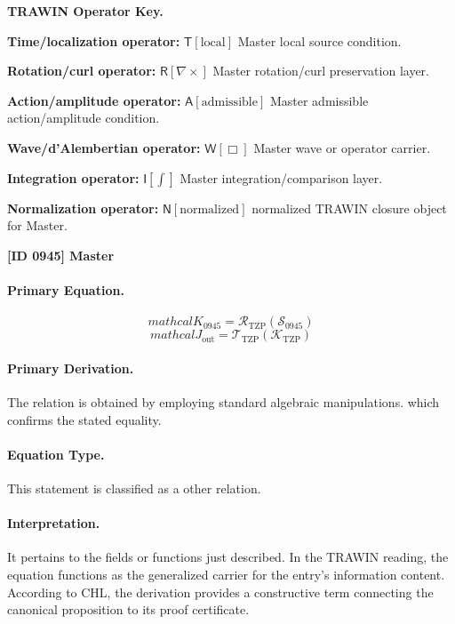 \par\vspace{0.45\baselineskip}
\noindent\begin{minipage}[t]{\linewidth}
\begingroup
\small
\raggedright
\textbf{TRAWIN Operator Key.}\par
\noindent\textbf{Time/localization operator:} $\mathsf{T}\!\left[\mathrm{local}\right]$ Master local source condition.\par
\noindent\textbf{Rotation/curl operator:} $\mathsf{R}\!\left[\nabla\times\right]$ Master rotation/curl preservation layer.\par
\noindent\textbf{Action/amplitude operator:} $\mathsf{A}\!\left[\mathrm{admissible}\right]$ Master admissible action/amplitude condition.\par
\noindent\textbf{Wave/d'Alembertian operator:} $\mathsf{W}\!\left[\Box\right]$ Master wave or operator carrier.\par
\noindent\textbf{Integration operator:} $\mathsf{I}\!\left[\int\right]$ Master integration/comparison layer.\par
\noindent\textbf{Normalization operator:} $\mathsf{N}\!\left[\mathrm{normalized}\right]$ normalized TRAWIN closure object for Master.\par
\endgroup
\end{minipage}

\clearpage
\noindent\textbf{[ID 0945] Master}\par
\vspace{0.35em}
\paragraph{Primary Equation.}
\[
mathcal{K}_{0945}=\mathcal{R}_{\mathrm{TZP}}\!\left(\mathcal{S}_{0945}\right)
\]
\[
mathcal{J}_{\mathrm{out}} = \mathcal{T}_{\mathrm{TZP}}\!\left(\mathcal{K}_{\mathrm{TZP}}\right)
\]

\paragraph{Primary Derivation.}
The relation is obtained by employing standard algebraic manipulations. which confirms the stated equality.
\paragraph{Equation Type.}
This statement is classified as a other relation.

\paragraph{Interpretation.}
It pertains to the fields or functions just described. In the TRAWIN reading, the equation functions as the generalized carrier for the entry’s information content. According to CHL, the derivation provides a constructive term connecting the canonical proposition to its proof certificate.

